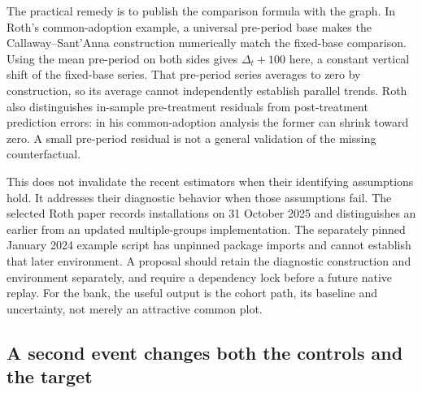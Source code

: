 The practical remedy is to publish the comparison formula with the graph. In Roth's common-adoption example, a universal
pre-period base makes the Callaway--Sant'Anna construction numerically match the fixed-base comparison. Using the mean
pre-period on both sides gives $\Delta_t+100$ here, a constant vertical shift of the fixed-base series.
That pre-period series averages to zero by construction, so its average cannot independently establish parallel trends.
Roth also distinguishes in-sample pre-treatment residuals from post-treatment prediction errors: in his common-adoption
analysis the former can shrink toward zero. A small pre-period residual is not a general validation of the missing
counterfactual.\citep{exec28_panel_roth}

This does not invalidate the recent estimators when their identifying assumptions hold. It addresses their diagnostic
behavior when those assumptions fail. The selected Roth paper records installations on 31 October 2025 and distinguishes
an earlier from an updated multiple-groups implementation. The separately pinned January 2024 example script has unpinned
package imports and cannot establish that later environment. A proposal should retain the diagnostic construction and
environment separately, and require a dependency lock before a future native replay. For the bank, the useful output is
the cohort path, its baseline and uncertainty, not merely an attractive common plot.\citep{exec28_panel_roth,exec28_panel_software}

\subsection{A second event changes both the controls and the target}

